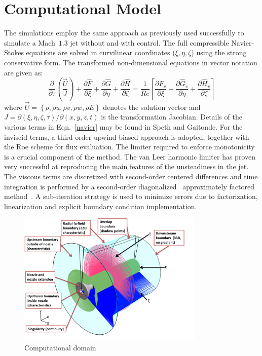 \documentclass[english]{aiaa-tc}
\begin{document}
\section{Computational Model}\label{theo}
The simulations employ the same approach as previously used
successfully to simulate a Mach~$1.3$ jet without and with
control\cite{gdv2011-POF,SpethCF2013}.  The full compressible
Navier-Stokes equations are solved in curvilinear coordinates
($\xi,\eta,\zeta$) using the
strong conservative form\cite{vm74-1,sjl78-1}. The transformed
non-dimensional equations in 
vector notation are given as: 
\begin{equation}
\frac{\partial}{\partial\tau}\left(\frac{\vec{U}}{J}\right)+\frac{\partial\hat{F}}{\partial\xi}+\frac{\partial\hat{G}}{\partial\eta}+\frac{\partial\hat{H}}{\partial\zeta}=\frac{1}{Re}\left[\frac{\partial\hat{F}_{v}}{\partial\xi}+\frac{\partial\hat{G}_{v}}{\partial\eta}+\frac{\partial\hat{H}_{v}}{\partial\zeta}\right]\label{navier}
\end{equation}
where $\vec{U}=\left\{ \rho,\rho u,\rho v,\rho w,\rho E\right\} $
denotes the solution vector and
$J=\partial\left(\xi,\eta,\zeta,\tau\right)/\partial\left(x,y,z,t\right)$
is the transformation Jacobian.  Details of the various terms in
Eqn.~\ref{navier} may be found in Speth and 
Gaitonde\cite{speth2012b}.
For the inviscid terms, a third-order upwind biased approach is
adopted, together with the Roe scheme\cite{rpl81-1} for flux evaluation.  The
limiter required to enforce monotonicity is a crucial 
component of the method.  The van Leer harmonic limiter\cite{lbv79-1}
has proven very successful at reproducing the main features of the
unsteadiness in the jet.  The viscous 
terms are discretized with second-order centered differences and time
integration is performed by a second-order diagonalized~\cite{pth81-1}
approximately 
factored method~\cite{br78-1}.  A sub-iteration
strategy is used to minimize errors due to factorization, linearization and
explicit boundary condition implementation.
\begin{figure}
\begin{center}
	\includegraphics[width=3.5in]{MACH09ComputationalDomain1.png}
\caption{Computational domain}\label{fig:M09Computationaldomain}
\end{center}
 \end{figure}
\end{document}
